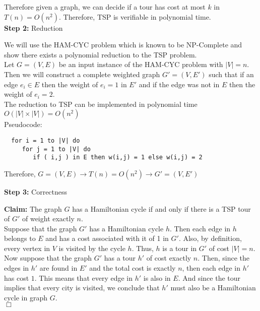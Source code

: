 \documentclass{article}
\newcommand{\qed}{\hfill \ensuremath{\Box}}
\begin{document}
     Therefore given a graph, we can decide if a tour has cost at most
     $k$ in $T(n) = O(n^2)$. Therefore, TSP is verifiable in polynomial time. \\

  {\bf Step 2:} Reduction

  We will use the HAM-CYC problem which is known to be NP-Complete
  and show there exists a polynomial reduction to the TSP problem. \\
  
  Let $G = (V,E)$ be an input instance of the HAM-CYC problem with
  $|V|=n$. Then we will construct a complete weighted graph $G' = (V, E')$ such
  that if an edge $e_i \in E$ then the weight of $e_i = 1$ in $E'$
  and if the edge was not in $E$ then the weight of $e_i = 2$. \\
  
  The reduction to TSP can be implemented in polynomial time
  $O(|V| \times |V|) = O(n^2)$ \\
  
  Pseudocode:
  
  \begin{verbatim}
  for i = 1 to |V| do
     for j = 1 to |V| do
        if ( i,j ) in E then w(i,j) = 1 else w(i,j) = 2
  \end{verbatim}
  
  Therefore, $G = (V, E) \rightarrow T(n) = O(n^2) \rightarrow G' = (V, E')$

  

  {\bf Step 3:} Correctness

  {\bf Claim: } The graph $G$ has a Hamiltonian cycle if and only
  if there is a TSP tour of $G'$ of weight exactly $n$. \\
  
  Suppose that the graph $G'$ has a Hamiltonian cycle $h$. Then
  each edge in $h$ belongs to $E$ and has a cost associated with
  it of 1 in $G'$. Also, by definition, every vertex in $V$
  is visited by the cycle $h$. Thus, $h$ is a tour in $G'$ of 
  cost $|V|=n$. \\
  
  Now suppose that the graph $G'$ has a tour $h'$ of cost exactly $n$.
  Then, since the edges in $h'$ are found in $E'$ and the total cost
  is exactly $n$, then each edge in $h'$ has cost $1$. This
  means that every edge in $h'$ is also in $E$. And since the tour
  implies that every city is visited, we conclude
  that $h'$ must also be a Hamiltonian cycle in graph $G$. \\
  
  \qed
    
\end{document}
